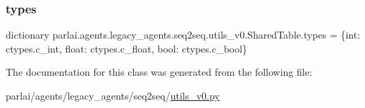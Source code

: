 \subsubsection{\texorpdfstring{types}{types}}
{\footnotesize\ttfamily dictionary parlai.\+agents.\+legacy\+\_\+agents.\+seq2seq.\+utils\+\_\+v0.\+Shared\+Table.\+types = \{int\+: ctypes.\+c\+\_\+int, float\+: ctypes.\+c\+\_\+float, bool\+: ctypes.\+c\+\_\+bool\}\hspace{0.3cm}{\ttfamily [static]}}



The documentation for this class was generated from the following file\+:\begin{DoxyCompactItemize}
\item 
parlai/agents/legacy\+\_\+agents/seq2seq/\hyperlink{utils__v0_8py}{utils\+\_\+v0.\+py}\end{DoxyCompactItemize}
